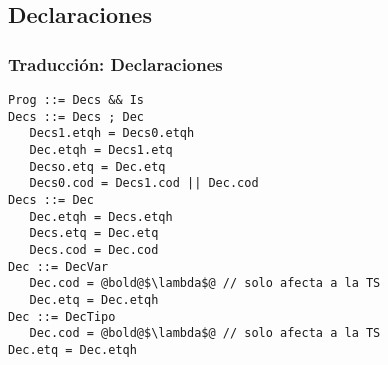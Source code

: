 \documentclass[hyperref={pdfpagelabels=false},tree-dvips,compress]{beamer}
\begin{document}
\subsection{Declaraciones}
\begin{frame}[fragile]
\frametitle{Traducción: Declaraciones}

\begin{lstlisting}[style=gramaticas,basicstyle=\scriptsize\ttfamily,mathescape]
Prog ::= Decs && Is
Decs ::= Decs ; Dec
   Decs1.etqh = Decs0.etqh
   Dec.etqh = Decs1.etq
   Decso.etq = Dec.etq
   Decs0.cod = Decs1.cod || Dec.cod
Decs ::= Dec
   Dec.etqh = Decs.etqh
   Decs.etq = Dec.etq
   Decs.cod = Dec.cod
Dec ::= DecVar
   Dec.cod = @bold@$\lambda$@ // solo afecta a la TS
   Dec.etq = Dec.etqh
Dec ::= DecTipo
   Dec.cod = @bold@$\lambda$@ // solo afecta a la TS
Dec.etq = Dec.etqh
\end{lstlisting}

\end{frame}
\end{document}
